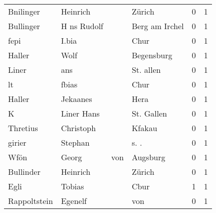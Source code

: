 \begin{center}
\begin{tiny}
\begin{longtabu}{llllrr}
                Bnilinger &                           Heinrich &             &                                      Zürich &          0 &         1 \\
                Bullinger &                        H ns Rudolf &             &                              Berg am Irchel &          0 &         1 \\
                     fepi &                              I.bia &             &                                        Chur &          0 &         1 \\
                   Haller &                               Wolf &             &                                  Begensburg &          0 &         1 \\
                    Liner &                                ans &             &                                   St. allen &          0 &         1 \\
                       lt &                              fbias &             &                                        Chur &          0 &         1 \\
                   Haller &                           Jekaanes &             &                                        Hera &          0 &         1 \\
                        K &                         Liner Hans &             &                                  St. Gallen &          0 &         1 \\
                 Thretius &                          Christoph &             &                                      Kfakau &          0 &         1 \\
                   girier &                            Stephan &             &                                       s. .  &          0 &         1 \\
                     Wfön &                              Georg &         von &                                    Augsburg &          0 &         1 \\
                Bullinder &                           Heinrich &             &                                      Zürich &          0 &         1 \\
                     Egli &                             Tobias &             &                                        Cbur &          1 &         1 \\
             Rappoltstein &                            Egenelf &             &                                         von &          0 &         1 \\

\end{longtabu}
\end{tiny}
\end{center}
